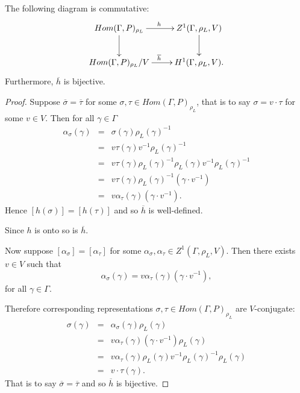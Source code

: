 \begin{lemma}
  The following diagram is commutative:
  \begin{displaymath}
    \xymatrix{
    Hom(\Gamma, P)_{\rho_L} \ar[r]^h \ar[d] & Z^{1}(\Gamma, \rho_L, V) \ar[d] \\
    Hom(\Gamma, P)_{\rho_L}/V \ar[r]^{\overline{h}} & H^{1}(\Gamma, \rho_L, V).
    }
  \end{displaymath}
  Furthermore, $\overline{h}$ is bijective.
  \label{lem:v_h1}
\end{lemma}
\begin{proof}  
  Suppose $\overline{\sigma} = \overline{\tau}$ for some $\sigma,\tau\in Hom(\Gamma, P)_{\rho_L}$, that is to say $\sigma = v\cdot\tau$ for some $v\in V$. Then for all $\gamma\in \Gamma$
  \begin{eqnarray*}
    \alpha_\sigma(\gamma) &=& \sigma(\gamma)\rho_L(\gamma)^{-1}\\
    &=& v\tau(\gamma)v^{-1}\rho_L(\gamma)^{-1}\\
    &=& v\tau(\gamma)\rho_L(\gamma)^{-1}\rho_L(\gamma)v^{-1}\rho_L(\gamma)^{-1}\\
    &=& v\tau(\gamma)\rho_L(\gamma)^{-1}(\gamma\cdot v^{-1})\\
    &=& v\alpha_\tau(\gamma)(\gamma\cdot v^{-1}).
  \end{eqnarray*}
  Hence $[h(\sigma)] = [h(\tau)]$ and so $\overline{h}$ is well-defined. 
  
  Since $h$ is onto so is $\overline{h}$.
  
  Now suppose $[\alpha_\sigma] = [\alpha_\tau]$ for some $\alpha_\sigma, \alpha_\tau \in Z^1(\Gamma, \rho_L, V)$. Then there exists $v \in V$ such that
  \begin{displaymath}
    \alpha_\sigma(\gamma) = v \alpha_\tau(\gamma)(\gamma \cdot v^{-1}),
  \end{displaymath}
  for all $\gamma \in \Gamma$.

  Therefore corresponding representations $\sigma, \tau \in Hom(\Gamma, P)_{\rho_L}$ are $V$-conjugate:
  \begin{eqnarray*}
    \sigma(\gamma) &=&  \alpha_\sigma(\gamma)\rho_L(\gamma) \\
    &=& v \alpha_\tau(\gamma)(\gamma \cdot v^{-1}) \rho_L(\gamma) \\
    &=& v \alpha_\tau(\gamma)\rho_L(\gamma) v^{-1} \rho_L(\gamma)^{-1} \rho_L(\gamma) \\
    &=& v \cdot \tau(\gamma).
  \end{eqnarray*}
  That is to say $\overline{\sigma} = \overline{\tau}$ and so $\overline{h}$ is bijective.
\end{proof}

